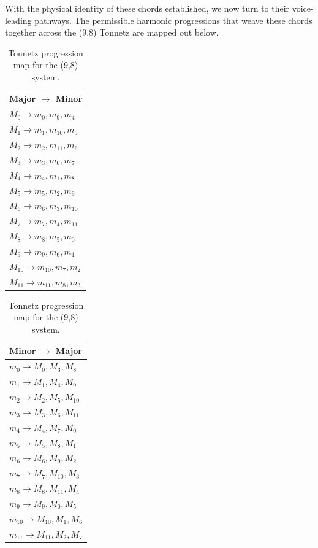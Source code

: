 \documentclass[11pt,letterpaper]{amsart}
\begin{document}
With the physical identity of these chords established, we now turn to their voice-leading pathways. The permissible harmonic progressions that weave these chords together across the (9,8) Tonnetz are mapped out below.

{\tiny \begin{table}[H]
    \centering
    \begin{minipage}{0.48\textwidth}
        \centering
        \begin{tabular}{l}
        \toprule
        \textbf{Major $\to$ Minor} \\
        \midrule
        $M_0 \to m_0, m_9, m_4$ \\
        $M_1 \to m_1, m_{10}, m_5$ \\
        $M_2 \to m_2, m_{11}, m_6$ \\
        $M_3 \to m_3, m_0, m_7$ \\
        $M_4 \to m_4, m_1, m_8$ \\
        $M_5 \to m_5, m_2, m_9$ \\
        $M_6 \to m_6, m_3, m_{10}$ \\
        $M_7 \to m_7, m_4, m_{11}$ \\
        $M_8 \to m_8, m_5, m_0$ \\
        $M_9 \to m_9, m_6, m_1$ \\
        $M_{10} \to m_{10}, m_7, m_2$ \\
        $M_{11} \to m_{11}, m_8, m_3$ \\
        \bottomrule
        \end{tabular}
    \end{minipage}\hfill
    \begin{minipage}{0.48\textwidth}
        \centering
        \begin{tabular}{l}
        \toprule
        \textbf{Minor $\to$ Major} \\
        \midrule
        $m_0 \to M_0, M_3, M_8$ \\
        $m_1 \to M_1, M_4, M_9$ \\
        $m_2 \to M_2, M_5, M_{10}$ \\
        $m_3 \to M_3, M_6, M_{11}$ \\
        $m_4 \to M_4, M_7, M_0$ \\
        $m_5 \to M_5, M_8, M_1$ \\
        $m_6 \to M_6, M_9, M_2$ \\
        $m_7 \to M_7, M_{10}, M_3$ \\
        $m_8 \to M_8, M_{11}, M_4$ \\
        $m_9 \to M_9, M_0, M_5$ \\
        $m_{10} \to M_{10}, M_1, M_6$ \\
        $m_{11} \to M_{11}, M_2, M_7$ \\
        \bottomrule
        \end{tabular}
    \end{minipage}
    \caption{Tonnetz progression map for the (9,8) system.}
\end{table}}
\end{document}
